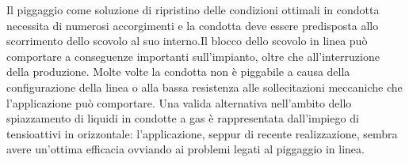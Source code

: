 Il piggaggio come soluzione di ripristino delle condizioni ottimali in condotta necessita di numerosi accorgimenti e la condotta deve essere predisposta allo scorrimento dello scovolo al suo interno.Il blocco dello scovolo in linea può comportare a conseguenze importanti sull'impianto, oltre che all'interruzione della produzione. Molte volte la condotta non è piggabile a causa della configurazione della linea o alla bassa resistenza alle sollecitazioni meccaniche che l'applicazione può comportare. Una valida alternativa nell'ambito dello spiazzamento di liquidi in condotte a gas è rappresentata dall'impiego di tensioattivi in orizzontale: l'applicazione, seppur di recente realizzazione, sembra avere un'ottima efficacia ovviando ai problemi legati al piggaggio in linea.
